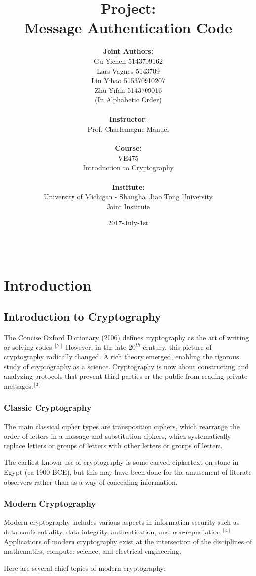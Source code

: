 \documentclass[12pt,a4paper,oneside]{report}
\author{
    \textbf{Joint Authors:}\\
    Gu Yichen 5143709162\\
    Lars Vagnes 5143709\\ 
    Liu Yihao 515370910207\\
    Zhu Yifan 5143709016\\
    \normalsize{(In Alphabetic Order)}\\
    \\
    \textbf{Instructor:}\\
    Prof. Charlemagne Manuel\\ \\ \textbf{Course:}\\VE475\\ Introduction to Cryptography\\ \\ \textbf{Institute:}\\University of Michigan - Shanghai Jiao Tong University\\Joint Institute}
\title{\textbf{Project:\\Message Authentication Code}}
\date{2017-July-1st}
\begin{document}
\maketitle

\begin{abstract}

\noindent \\
\end{abstract}


\tableofcontents
\chapter{  Introduction}
\section{Introduction to Cryptography}
The Concise Oxford Dictionary (2006) defines cryptography as the art of writing or solving codes.$^{[2]}$ However, in the late $20^{th}$ century, this picture of cryptography radically changed. A rich theory emerged, enabling the rigorous study of cryptography as a science. Cryptography is now about constructing and analyzing protocols that prevent third parties or the public from reading private messages.$^{[3]}$

\subsection{Classic Cryptography}
The main classical cipher types are transposition ciphers, which rearrange the order of letters in a message and substitution ciphers, which systematically replace letters or groups of letters with other letters or groups of letters. 

The earliest known use of cryptography is some carved ciphertext on stone in Egypt (ca 1900 BCE), but this may have been done for the amusement of literate observers rather than as a way of concealing information.

\subsection{Modern Cryptography}
Modern cryptography includes various aspects in information security such as data confidentiality, data integrity, authentication, and non-repudiation.$^{[4]}$ Applications of modern cryptography exist at the intersection of the disciplines of mathematics, computer science, and electrical engineering.

Here are several chief topics of modern cryptography:
\end{document}
